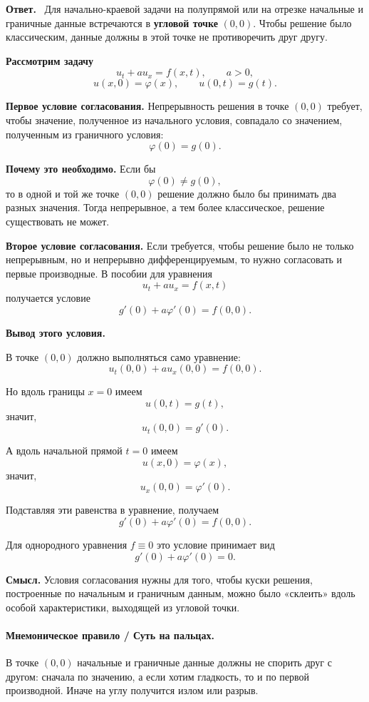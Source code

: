 \documentclass[a4paper,12pt]{article}
\newcommand{\Answer}{\textbf{Ответ.}\ }
\begin{document}
\Answer
Для начально-краевой задачи на полупрямой или на отрезке начальные и граничные данные встречаются в \textbf{угловой точке} $(0,0)$. Чтобы решение было классическим, данные должны в этой точке не противоречить друг другу.

\textbf{Рассмотрим задачу}
\[
u_t+a u_x=f(x,t),
\qquad a>0,
\]
\[
u(x,0)=\varphi(x),
\qquad
u(0,t)=g(t).
\]

\textbf{Первое условие согласования.} Непрерывность решения в точке $(0,0)$ требует, чтобы значение, полученное из начального условия, совпадало со значением, полученным из граничного условия:
\[
\varphi(0)=g(0).
\]

\textbf{Почему это необходимо.}
Если бы
\[
\varphi(0)\ne g(0),
\]
то в одной и той же точке $(0,0)$ решение должно было бы принимать два разных значения. Тогда непрерывное, а тем более классическое, решение существовать не может.

\textbf{Второе условие согласования.} Если требуется, чтобы решение было не только непрерывным, но и непрерывно дифференцируемым, то нужно согласовать и первые производные. В пособии для уравнения
\[
u_t+a u_x=f(x,t)
\]
получается условие
\[
g'(0)+a\varphi'(0)=f(0,0).
\]

\textbf{Вывод этого условия.}

В точке $(0,0)$ должно выполняться само уравнение:
\[
u_t(0,0)+a u_x(0,0)=f(0,0).
\]

Но вдоль границы $x=0$ имеем
\[
u(0,t)=g(t),
\]
значит,
\[
u_t(0,0)=g'(0).
\]

А вдоль начальной прямой $t=0$ имеем
\[
u(x,0)=\varphi(x),
\]
значит,
\[
u_x(0,0)=\varphi'(0).
\]

Подставляя эти равенства в уравнение, получаем
\[
g'(0)+a\varphi'(0)=f(0,0).
\]

Для однородного уравнения $f\equiv 0$ это условие принимает вид
\[
g'(0)+a\varphi'(0)=0.
\]

\textbf{Смысл.} Условия согласования нужны для того, чтобы куски решения, построенные по начальным и граничным данным, можно было «склеить» вдоль особой характеристики, выходящей из угловой точки.

\paragraph{Мнемоническое правило / Суть на пальцах.}
В точке $(0,0)$ начальные и граничные данные должны не спорить друг с другом: сначала по значению, а если хотим гладкость, то и по первой производной. Иначе на углу получится излом или разрыв.
\end{document}
